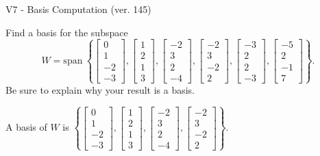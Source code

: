 \begin{exercise}
  \begin{exerciseTitle}V7 - Basis Computation (ver. 145)\end{exerciseTitle}
  \begin{exerciseStatement}
    Find a basis for the subspace 
\[W=\mathrm{span}\ \left\{\left[\begin{array}{r}
0 \\
1 \\
-2 \\
-3
\end{array}\right] , \left[\begin{array}{r}
1 \\
2 \\
1 \\
3
\end{array}\right] , \left[\begin{array}{r}
-2 \\
3 \\
2 \\
-4
\end{array}\right] , \left[\begin{array}{r}
-2 \\
3 \\
-2 \\
2
\end{array}\right] , \left[\begin{array}{r}
-3 \\
2 \\
2 \\
-3
\end{array}\right] , \left[\begin{array}{r}
-5 \\
2 \\
-1 \\
7
\end{array}\right]\right\}.\]
 Be sure to explain why your result is a basis.


  \end{exerciseStatement}
  \begin{exerciseAnswer}
   A basis of \(W\) is  \(\left\{\left[\begin{array}{r}
0 \\
1 \\
-2 \\
-3
\end{array}\right] , \left[\begin{array}{r}
1 \\
2 \\
1 \\
3
\end{array}\right] , \left[\begin{array}{r}
-2 \\
3 \\
2 \\
-4
\end{array}\right] , \left[\begin{array}{r}
-2 \\
3 \\
-2 \\
2
\end{array}\right]\right\}\).
  


  \end{exerciseAnswer}
\end{exercise}